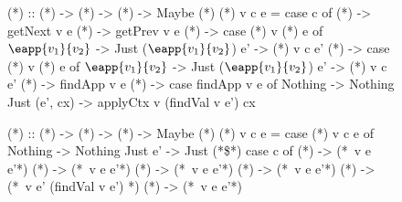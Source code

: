 \begin{figure}[t]
\begin{mcode}
(*\findExpr*) :: (*\vstate*) -> (*\cmd*) -> (*\expr*) -> Maybe (*\expr*)
(*\findExpr*) v c e = case c of
  (*\stepforwardc*) -> getNext v e
  (*\stepbackwardc*)    -> getPrev v e
  (*\jumpforwardc*) -> case (*\findExpr*) v (*\stepforwardc*) e of
    $\eapp{v_1}{v_2}$ -> Just ($\eapp{v_1}{v_2}$)
    e'   -> (*\findExpr*) v c e'
  (*\jumpbackwardc*)    -> case (*\findExpr*) v (*\stepbackwardc*) e of
    $\eapp{v_1}{v_2}$ -> Just ($\eapp{v_1}{v_2}$)
    e'   -> (*\findExpr*) v c e'
  (*\stepintoc*)    -> findApp v e
  (*\stepoverc*)    -> case findApp v e of
    Nothing       -> Nothing
    Just (e', cx) -> applyCtx v (findVal v e') cx

(*\updState*) :: (*\vstate*) -> (*\cmd*) -> (*\expr*) -> Maybe (*\vstate*)
(*\updState*) v c e = case (*\findExpr*) v c e of
  Nothing -> Nothing
  Just e' -> Just (*\$*) case c of
    (*\stepforwardc*) -> (*\putAfter\ v e e'*)
    (*\stepbackwardc*)    -> (*\putBefore\ v e e'*)
    (*\jumpforwardc*) -> (*\putAfter\ v e e'*)
    (*\jumpbackwardc*)    -> (*\putBefore\ v e e'*)
    (*\stepintoc*)    -> (*\putRoot\ v e' (findVal v e') *)
    (*\stepoverc*)    -> (*\putAfter\ v e e'*)
\end{mcode}

\end{figure}
